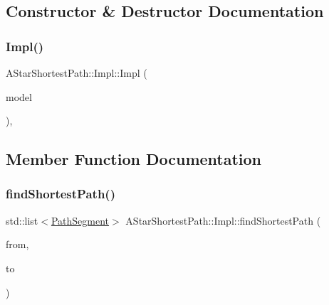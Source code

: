 \subsection{Constructor \& Destructor Documentation}
\mbox{\label{struct_a_star_shortest_path_1_1_impl_ad2ba7393a9f4735121dce3a44c9c7317}} 
\subsubsection{\texorpdfstring{Impl()}{Impl()}}
{\footnotesize\ttfamily A\+Star\+Shortest\+Path\+::\+Impl\+::\+Impl (\begin{DoxyParamCaption}\item[{\mbox{\hyperlink{class_displace_model}{Displace\+Model}} $\ast$}]{model }\end{DoxyParamCaption})\hspace{0.3cm}{\ttfamily [inline]}, {\ttfamily [explicit]}}



\subsection{Member Function Documentation}
\mbox{\label{struct_a_star_shortest_path_1_1_impl_a4b2e3e26b0e086bc47fe4a8561a1f1e0}} 
\subsubsection{\texorpdfstring{findShortestPath()}{findShortestPath()}}
{\footnotesize\ttfamily std\+::list$<$\mbox{\hyperlink{struct_a_star_shortest_path_1_1_impl_1_1_path_segment}{Path\+Segment}}$>$ A\+Star\+Shortest\+Path\+::\+Impl\+::find\+Shortest\+Path (\begin{DoxyParamCaption}\item[{My\+Geo\+Graph\+::vertex}]{from,  }\item[{My\+Geo\+Graph\+::vertex}]{to }\end{DoxyParamCaption})\hspace{0.3cm}{\ttfamily [inline]}}



